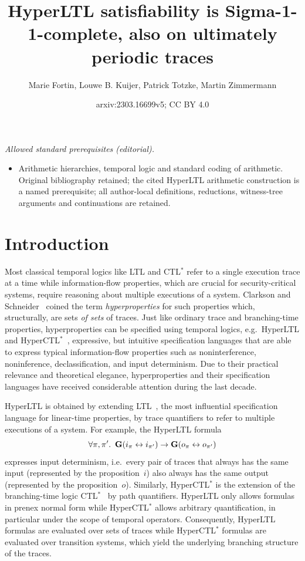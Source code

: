 \documentclass[dvipsnames,10pt,a4paper]{amsart}
\title{HyperLTL satisfiability is Sigma-1-1-complete, also on ultimately periodic traces}
\author{Marie Fortin, Louwe B. Kuijer, Patrick Totzke, Martin Zimmermann}
\date{arxiv:2303.16699v5; CC BY 4.0}
\theoremstyle{definition}
\theoremstyle{remark}
\newcommand{\G}{\mathop{\mathbf{G}\vphantom{a}}\nolimits}
\newcommand{\ltl}{{LTL}\xspace}
\newcommand{\ctlstar}{{CTL$^*$}\xspace}
\newcommand{\hyltl}{{HyperLTL}\xspace}
\newcommand{\hyctlstar}{{HyperCTL$^*$}\xspace}
\begin{document}
\maketitle
\noindent\textit{Allowed standard prerequisites (editorial).}\begin{itemize}
\item Arithmetic hierarchies, temporal logic and standard coding of arithmetic. Original bibliography retained; the cited HyperLTL arithmetic construction is a named prerequisite; all author-local definitions, reductions, witness-tree arguments and continuations are retained.
\end{itemize}\medskip
\section{Introduction}
\label{sec:intro}

Most classical temporal logics like \ltl and \ctlstar refer to a single execution trace at a time while information-flow properties, which are crucial for security-critical systems,
require reasoning about multiple executions of a system. 
Clarkson and Schneider~\cite{ClarksonS10} coined the term \emph{hyperproperties} for such properties which, structurally, are sets \emph{of sets} of traces.
Just like ordinary trace and branching-time properties, hyperproperties can be specified using temporal logics, e.g.\ \hyltl and \hyctlstar~\cite{ClarksonFKMRS14}, expressive, but intuitive specification languages that are able to express typical information-flow properties such as noninterference, noninference, declassification, and input determinism.
Due to their practical relevance and theoretical elegance, hyperproperties and their specification languages have received considerable attention during the last decade.

\hyltl is obtained by extending \ltl~\cite{Pnueli77}, the most influential specification language for linear-time properties, by trace quantifiers to refer to multiple executions of a system. 
For example, the \hyltl formula
\[\forall \pi, \pi'.\ \G( i_\pi \leftrightarrow i_{\pi'}) \rightarrow \G (o_\pi \leftrightarrow o_{\pi'}) \]
expresses input determinism, i.e.\ every pair of traces that always has the same input (represented by the proposition~$i$) also always has the same output (represented by the proposition~$o$). 
Similarly, \hyctlstar is the extension of the branching-time logic \ctlstar~\cite{EmersonH86} by path quantifiers. 
\hyltl only allows formulas in prenex normal form while \hyctlstar allows arbitrary quantification, in particular under the scope of temporal operators. 
Consequently, \hyltl formulas are evaluated over sets of traces while \hyctlstar formulas are evaluated over transition systems, which yield the underlying branching structure of the traces. 
\end{document}
